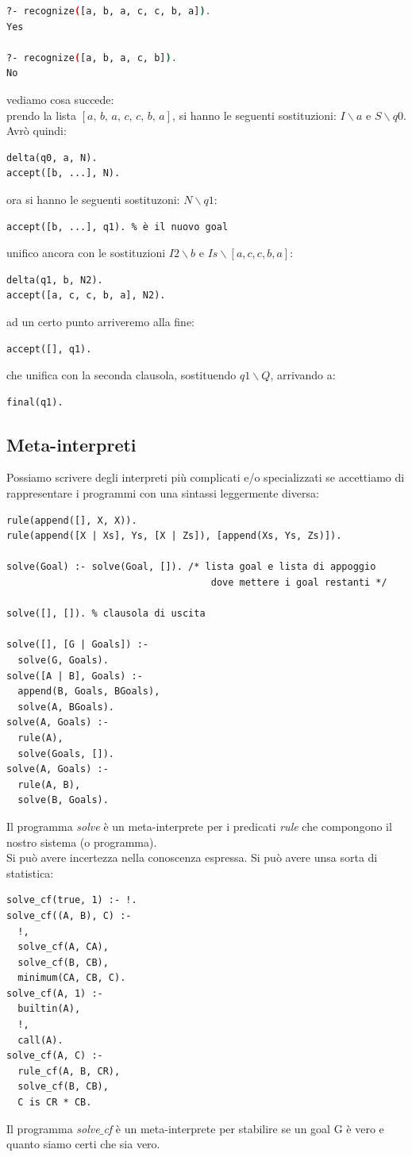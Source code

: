 \documentclass[a4paper,12pt, oneside]{book}
\begin{document}
\begin{shaded}
	\begin{lstlisting}[language=bash]
?- recognize([a, b, a, c, c, b, a]).
Yes

?- recognize([a, b, a, c, b]).
No
\end{lstlisting}
\end{shaded}
vediamo cosa succede:\\
prendo la lista $[a,\,b,\,a,\,c,\,c,\,b,\,a]$, si hanno le seguenti sostituzioni: $I\backslash a$ e $S\backslash q0$. Avrò quindi:
\begin{verbatim}
delta(q0, a, N).
accept([b, ...], N).
\end{verbatim}
ora si hanno le seguenti sostituzoni: $N\backslash q1$:
\begin{verbatim}
accept([b, ...], q1). % è il nuovo goal
\end{verbatim}
\newpage
unifico ancora con le sostituzioni $I2\backslash b$ e $Is\backslash [a,c,c,b,a]$:
\begin{verbatim}
delta(q1, b, N2).
accept([a, c, c, b, a], N2).
\end{verbatim}
ad un certo punto arriveremo alla fine:
\begin{verbatim}
accept([], q1).
\end{verbatim}
che unifica con la seconda clausola, sostituendo $q1\backslash Q$, arrivando a:
\begin{verbatim}
final(q1).
\end{verbatim}
\subsection{Meta-interpreti}
Possiamo scrivere degli interpreti più complicati e/o specializzati
se accettiamo di rappresentare i programmi con una sintassi
leggermente diversa:
\begin{verbatim}
rule(append([], X, X)).
rule(append([X | Xs], Ys, [X | Zs]), [append(Xs, Ys, Zs)]).

solve(Goal) :- solve(Goal, []). /* lista goal e lista di appoggio 
                                    dove mettere i goal restanti */

solve([], []). % clausola di uscita

solve([], [G | Goals]) :-
  solve(G, Goals).
solve([A | B], Goals) :-
  append(B, Goals, BGoals),
  solve(A, BGoals).
solve(A, Goals) :-
  rule(A),
  solve(Goals, []).
solve(A, Goals) :-
  rule(A, B),
  solve(B, Goals).
\end{verbatim}
Il programma \textit{solve} è un meta-interprete per i predicati \textit{rule }che compongono il nostro sistema (o programma).\\
\newpage
Si può avere incertezza nella conoscenza espressa. Si può avere unsa sorta di statistica:
\begin{verbatim}
solve_cf(true, 1) :- !.
solve_cf((A, B), C) :-
  !,
  solve_cf(A, CA),
  solve_cf(B, CB),
  minimum(CA, CB, C).
solve_cf(A, 1) :-
  builtin(A),
  !,
  call(A).
solve_cf(A, C) :-
  rule_cf(A, B, CR),
  solve_cf(B, CB),
  C is CR * CB.
\end{verbatim}
Il programma \textit{solve}$\_$\textit{cf} è un meta-interprete per stabilire se un goal G è vero e quanto siamo certi che sia vero.
\end{document}
